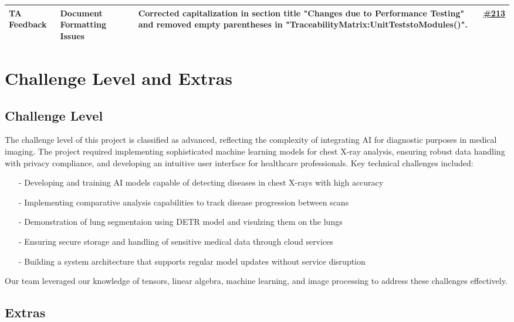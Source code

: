 \documentclass{article}
\begin{document}
\begin{longtable}{| p{} | p{} | p{} | p{} |}
    \hline
    TA Feedback & Document Formatting Issues & Corrected capitalization in section title "Changes due to Performance Testing" and removed empty parentheses in "TraceabilityMatrix:UnitTeststoModules()". & \href{https://github.com/RezaJodeiri/CXR-Capstone/issues/213#issue-2973794790}{\#213}\\
    \hline


\end{longtable}

\section{Challenge Level and Extras}

\subsection{Challenge Level}

The challenge level of this project is classified as advanced, reflecting the complexity of integrating AI for diagnostic purposes in medical imaging. The project required implementing sophisticated machine learning models for chest X-ray analysis, ensuring robust data handling with privacy compliance, and developing an intuitive user interface for healthcare professionals.
\newline
Key technical challenges included:
\begin{itemize}
    \item[-] Developing and training AI models capable of detecting diseases in chest X-rays with high accuracy
    \item[-] Implementing comparative analysis capabilities to track disease progression between scans
    \item[-] Demonstration of lung segmentaion using DETR model and visulzing them on the lungs
    \item[-] Ensuring secure storage and handling of sensitive medical data through cloud services
    \item[-] Building a system architecture that supports regular model updates without service disruption
\end{itemize}

\noindent Our team leveraged our knowledge of tensors, linear algebra, machine learning, and image processing to address these challenges effectively.


\subsection{Extras}
\end{document}
